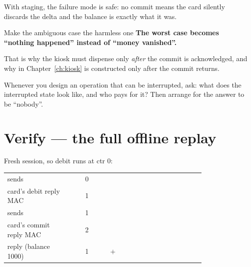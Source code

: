 With staging, the failure mode is safe: no commit means the card silently
discards the delta and the balance is exactly what it was.

\begin{concept}{Make the ambiguous case the harmless one}
\textbf{The worst case becomes ``nothing happened'' instead of ``money
vanished''.}

That is why the kiosk must dispense only \emph{after} the commit is acknowledged,
and why  in Chapter~\ref{ch:kiosk} is constructed only after
the commit returns.

Whenever you design an operation that can be interrupted, ask: what does the
interrupted state look like, and who pays for it? Then arrange for the answer to
be ``nobody''.
\end{concept}

\section{Verify --- the full offline replay}

Fresh session, so debit runs at ctr 0:

\begin{center}\small
\begin{tabular}{@{}L{0.32\linewidth}cL{0.48\linewidth}@{}}
\toprule
{} &  &  \\
\midrule
{} sends & 0 & \newline{} \\
card's debit reply MAC        & 1 &  \\
 sends & 1 &  \\
card's commit reply MAC       & 2 &  \\
 reply (balance 1000) & 1 & \newline $+$  \\
\bottomrule
\end{tabular}
\end{center}

